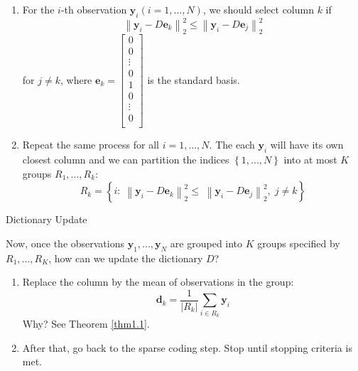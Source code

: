 \documentclass[11pt]{article}
\begin{document}
\begin{enumerate}
	\item For the $ i $-th observation $ \boldsymbol{y}_{i} (i=1,...,N) $, we should select column $ k $ if
	\begin{equation}
	\left\| {{\boldsymbol{y}_i} - D{\boldsymbol{e}_k}} \right\|_2^2 \leqslant \left\| {{\boldsymbol{y}_i} - D{\boldsymbol{e}_j}} \right\|_2^2
	\end{equation}
	for $ j \ne k $, where $ \boldsymbol{e}_{k} = \left[ {\begin{matrix}
		0  \\ 
		0  \\ 
		\vdots   \\ 
		0  \\ 
		1  \\ 
		0  \\ 
		\vdots   \\ 
		0  \\ 
		
		\end{matrix} } \right] $ is the standard basis.
	\item Repeat the same process for all $ i = 1,..., N $. The each $ \boldsymbol{y}_{i} $ will have its own closest column and we can  partition the indices $\left\{ {1,...,N} \right\}$ into at most $ K $ groups $ R_{1},...,R_{k} $:
	\begin{equation}
	{R_k} = \left\{ {i:\;\left\| {{\boldsymbol{y}_i} - D{\boldsymbol{e}_k}} \right\|_2^2 \leqslant \;\left\| {{\boldsymbol{y}_i} - D{\boldsymbol{e}_j}} \right\|_2^2,\;j \ne k} \right\}
	\end{equation}
\end{enumerate}

\begin{center}
	\Large Dictionary Update
\end{center}

\vspace{-0.5cm}

Now, once the observations $ \boldsymbol{y}_{1},...,\boldsymbol{y}_{N} $ are grouped into $ K $ groups specified by $ R_{1},...,R_{K} $, how can we update the dictionary $ D $?

\begin{enumerate}
	\item Replace the column by the mean of observations in the group:
	\begin{equation}
	{\boldsymbol{d}_k} = \frac{1}{{\left| {{R_k}} \right|}}\sum\limits_{i \in {R_k}} {{\boldsymbol{y}_i}} 
	\end{equation}
	Why? See Theorem \ref{thm1.1}. 
	\item After that, go back to the sparse coding step. Stop until stopping criteria is met.
\end{enumerate}
\end{document}
